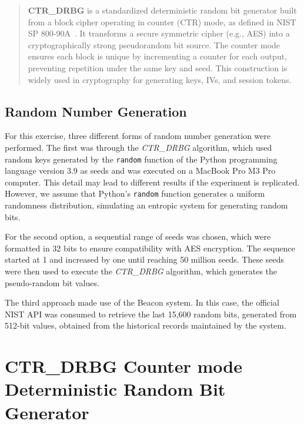 \begin{quote}
\textbf{CTR\_DRBG} is a standardized deterministic random bit generator built from a block cipher operating in counter (CTR) mode, as defined in NIST SP 800-90A~\cite{nist80090a}. It transforms a secure symmetric cipher (e.g., AES) into a cryptographically strong pseudorandom bit source. The counter mode ensures each block is unique by incrementing a counter for each output, preventing repetition under the same key and seed. This construction is widely used in cryptography for generating keys, IVs, and session tokens.
\end{quote}


\subsection{Random Number Generation}
\label{sec:random_generation}

\noindent
For this exercise, three different forms of random number generation were performed. The first was through the \textit{CTR\_DRBG} algorithm, which used random keys generated by the \texttt{random} function of the Python programming language version 3.9 as seeds and was executed on a MacBook Pro M3 Pro computer. This detail may lead to different results if the experiment is replicated. However, we assume that Python's \texttt{random} function generates a uniform randomness distribution, simulating an entropic system for generating random bits.

For the second option, a sequential range of seeds was chosen, which were formatted in 32 bits to ensure compatibility with AES encryption. The sequence started at 1 and increased by one until reaching 50 million seeds. These seeds were then used to execute the \textit{CTR\_DRBG} algorithm, which generates the pseudo-random bit values.

The third approach made use of the Beacon system. In this case, the official NIST API was consumed to retrieve the last 15,600 random bits, generated from 512-bit values, obtained from the historical records maintained by the system.


\section{CTR\_DRBG Counter mode Deterministic Random Bit Generator}
\label{sec:ctr_drbg}

